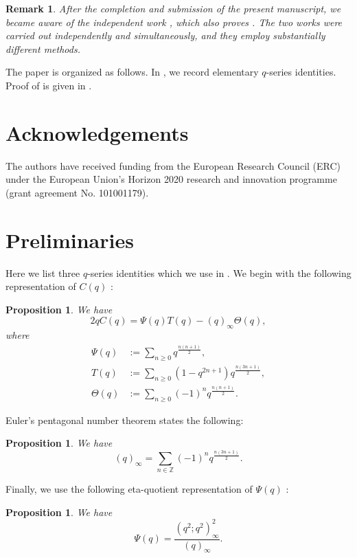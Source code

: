 \documentclass[10pt,a4paper]{amsart}
\renewcommand{\(}{\left\(}
\renewcommand{\)}{\right\)}
\numberwithin{equation}{section}
\newtheorem{proposition}[theorem]{Proposition}
\newtheorem*{remark}{Remark}
\numberwithin{equation}{section}
\begin{document}

\begin{remark}
After the completion and submission of the present manuscript, we became aware of the independent work \cite{LX}, which also proves . The two works were carried out independently and simultaneously, and they employ substantially different methods.
\end{remark}


 The paper is organized as follows. In , we record elementary $q$-series identities. Proof of  is given in . %

\section*{Acknowledgements}
The authors have received funding from the European Research Council (ERC) under the European Union's Horizon 2020 research and innovation programme (grant agreement No. 101001179).

\section{Preliminaries}\label{sec1}

Here we list three $q$-series identities which we use in . We begin with the following representation of $C(q)$ \cite[equation (4.8)]{AB}:
\begin{proposition}\label{prop0}
We have
\[
2qC(q)=\Psi(q)T(q)-(q)_{\infty}\Theta(q),
\]
where %
\begin{align}\label{def1}
\Psi(q)&:=\sum_{n\ge 0}q^{\frac{n(n+1)}{2}},\\\label{def2}
T(q)&:=\sum_{n\ge 0}\left(1-q^{2n+1}\right)q^{\frac{n(3n+1)}{2}},\\\label{def3}
\Theta(q)&:=\sum_{n\ge 0}(-1)^n q^{\frac{n(n+1)}{2}}.
\end{align}
\end{proposition}
Euler's pentagonal number theorem \cite[Corollary 1.7]{Andbook} states the following:
\begin{proposition}\label{prop1}
We have 
\[
(q)_{\infty}=\sum_{n\in \mathbb{Z}}(-1)^n q^{\frac{n(3n+1)}{2}}.
\]
\end{proposition}
Finally, we use the following eta-quotient representation of $\Psi(q)$ \cite[equation (2.2.13)]{Andbook}:
\begin{proposition}\label{prop2}
We have
\[
\Psi(q)=\frac{\left(q^2;q^2\right)^2_{\infty}}{(q)_{\infty}}.
\]
\end{proposition}
\end{document}
